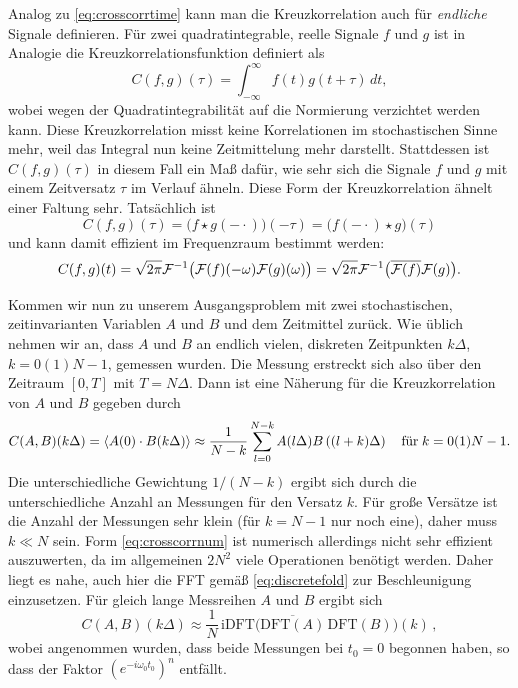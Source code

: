Analog zu \eqref{eq:crosscorrtime} kann man die Kreuzkorrelation auch
für \emph{endliche} Signale definieren. Für zwei quadratintegrable, reelle
Signale $f$ und $g$ ist in Analogie die Kreuzkorrelationsfunktion
definiert als
\begin{equation}
  C(f,g)(\tau) = \int_{-\infty}^{\infty} f(t)g(t+\tau)\,dt,
\end{equation}
wobei wegen der Quadratintegrabilität auf die Normierung verzichtet
werden kann. Diese Kreuzkorrelation misst keine Korrelationen im
stochastischen Sinne mehr, weil das Integral nun keine Zeitmittelung
mehr darstellt. Stattdessen ist $C(f,g)(\tau)$ in diesem Fall ein Maß
dafür, wie sehr sich die Signale $f$ und $g$ mit einem Zeitversatz
$\tau$ im Verlauf ähneln. Diese Form der Kreuzkorrelation ähnelt einer
Faltung sehr. Tatsächlich ist
\begin{equation}
  C(f,g)(\tau) = \bigl(f \star g(-\cdot)\bigr)(-\tau) =
  \bigl(f(-\cdot) \star g\bigr)(\tau)
\end{equation}
und kann damit effizient im Frequenzraum bestimmt werden:
\begin{equation}
  \label{eq:crosscorrfft}
  C(f,g)(t) = \sqrt{2\pi}\mathcal F^{-1}
  \bigl(\mathcal F(f)(-\omega)\mathcal F(g)(\omega)\bigr) = \sqrt{2\pi}\mathcal F^{-1}
  \bigl(\overline{\mathcal F(f)}\mathcal F(g)\bigr).
\end{equation}

Kommen wir nun zu unserem Ausgangsproblem mit zwei stochastischen,
zeitinvarianten Variablen $A$ und $B$ und dem Zeitmittel zurück. Wie
üblich nehmen wir an, dass $A$ und $B$ an endlich vielen, diskreten
Zeitpunkten $k\Delta$, $k=0(1)N-1$, gemessen wurden. Die Messung
erstreckt sich also über den Zeitraum $[0,T]$ mit $T=N\Delta$. Dann
ist eine Näherung für die Kreuzkorrelation von $A$ und $B$ gegeben
durch
\begin{equation}
  \label{eq:crosscorrnum}
  C(A,B)(k\Delta) = \left\langle{A(0)\cdot B(k\Delta)}\right\rangle
  \approx
  \frac{1}{N-k}\sum_{l=0}^{N-k}A(l\Delta)B\left((l+k)\Delta\right)
  \quad\text{für}\; k=0(1)N-1.
\end{equation}
Die unterschiedliche Gewichtung $1/(N-k)$ ergibt sich durch die
unterschiedliche Anzahl an Messungen für den Versatz $k$. Für große
Versätze ist die Anzahl der Messungen sehr klein (für $k=N-1$ nur noch
eine), daher muss $k \ll N$ sein. Form \eqref{eq:crosscorrnum} ist
numerisch allerdings nicht sehr effizient auszuwerten, da im
allgemeinen $2N^2$ viele Operationen benötigt werden.  Daher liegt es
nahe, auch hier die FFT gemäß \eqref{eq:discretefold} zur
Beschleunigung einzusetzen.  Für gleich lange Messreihen $A$ und $B$
ergibt sich
\begin{equation}
  \label{eq:crosscorrnumfft}
  C(A,B)(k\Delta)
  \approx
  \frac{1}{N}\,\text{iDFT}
  \bigl(\overline{\text{DFT}(A)}\,\text{DFT}(B)\bigr)(k)\,,
\end{equation}
wobei angenommen wurden, dass beide Messungen bei $t_0=0$ begonnen
haben, so dass der Faktor $\left(e^{-i\omega_0 t_0}\right)^n$
entfällt.

